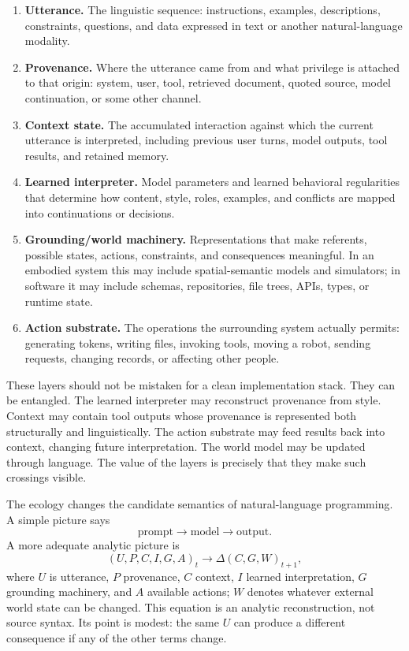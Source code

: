 \documentclass[11pt]{article}
\begin{document}
\begin{enumerate}[leftmargin=*,itemsep=.55em]
\item \textbf{Utterance.} The linguistic sequence: instructions, examples, descriptions, constraints, questions, and data expressed in text or another natural-language modality.
\item \textbf{Provenance.} Where the utterance came from and what privilege is attached to that origin: system, user, tool, retrieved document, quoted source, model continuation, or some other channel.
\item \textbf{Context state.} The accumulated interaction against which the current utterance is interpreted, including previous user turns, model outputs, tool results, and retained memory.
\item \textbf{Learned interpreter.} Model parameters and learned behavioral regularities that determine how content, style, roles, examples, and conflicts are mapped into continuations or decisions.
\item \textbf{Grounding/world machinery.} Representations that make referents, possible states, actions, constraints, and consequences meaningful. In an embodied system this may include spatial-semantic models and simulators; in software it may include schemas, repositories, file trees, APIs, types, or runtime state.
\item \textbf{Action substrate.} The operations the surrounding system actually permits: generating tokens, writing files, invoking tools, moving a robot, sending requests, changing records, or affecting other people.
\end{enumerate}

These layers should not be mistaken for a clean implementation stack. They can be entangled. The learned interpreter may reconstruct provenance from style. Context may contain tool outputs whose provenance is represented both structurally and linguistically. The action substrate may feed results back into context, changing future interpretation. The world model may be updated through language. The value of the layers is precisely that they make such crossings visible.

The ecology changes the candidate semantics of natural-language programming. A simple picture says
\[
\text{prompt} \longrightarrow \text{model} \longrightarrow \text{output}.
\]
A more adequate analytic picture is
\[
(U,P,C,I,G,A)_t \longrightarrow \Delta(C,G,W)_{t+1},
\]
where $U$ is utterance, $P$ provenance, $C$ context, $I$ learned interpretation, $G$ grounding machinery, and $A$ available actions; $W$ denotes whatever external world state can be changed. This equation is an analytic reconstruction, not source syntax. Its point is modest: the same $U$ can produce a different consequence if any of the other terms change.
\end{document}
